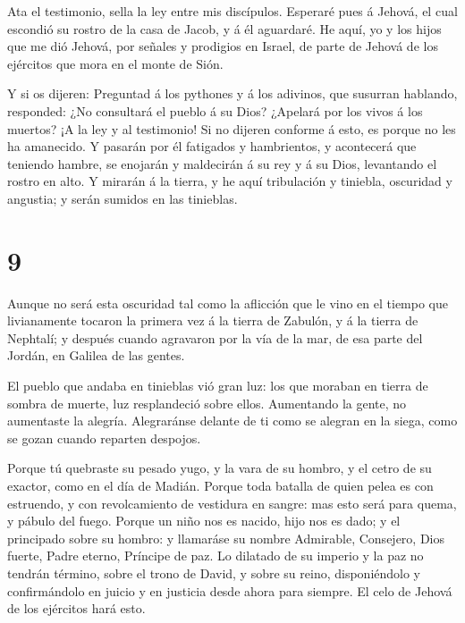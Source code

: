  Ata el testimonio, sella la ley entre mis discípulos.
 Esperaré pues á Jehová, el cual escondió su rostro de la
casa de Jacob, y á él aguardaré.  He aquí, yo y los hijos
que me dió Jehová, por señales y prodigios en Israel, de parte de Jehová
de los ejércitos que mora en el monte de Sión.

 Y si os dijeren: Preguntad á los pythones y á los
adivinos, que susurran hablando, responded: ¿No consultará el pueblo á
su Dios? ¿Apelará por los vivos á los muertos?  ¡A la ley y
al testimonio! Si no dijeren conforme á esto, es porque no les ha
amanecido.  Y pasarán por él fatigados y hambrientos, y
acontecerá que teniendo hambre, se enojarán y maldecirán á su rey y á su
Dios, levantando el rostro en alto.  Y mirarán á la tierra,
y he aquí tribulación y tiniebla, oscuridad y angustia; y serán sumidos
en las tinieblas.

\hypertarget{section-8}{%
\section{9}\label{section-8}}

 Aunque no será esta oscuridad tal como la aflicción que le
vino en el tiempo que livianamente tocaron la primera vez á la tierra de
Zabulón, y á la tierra de Nephtalí; y después cuando agravaron por la
vía de la mar, de esa parte del Jordán, en Galilea de las gentes.

 El pueblo que andaba en tinieblas vió gran luz: los que
moraban en tierra de sombra de muerte, luz resplandeció sobre ellos.
 Aumentando la gente, no aumentaste la alegría. Alegraránse
delante de ti como se alegran en la siega, como se gozan cuando reparten
despojos.

 Porque tú quebraste su pesado yugo, y la vara de su hombro,
y el cetro de su exactor, como en el día de Madián.  Porque
toda batalla de quien pelea es con estruendo, y con revolcamiento de
vestidura en sangre: mas esto será para quema, y pábulo del fuego.
 Porque un niño nos es nacido, hijo nos es dado; y el
principado sobre su hombro: y llamaráse su nombre Admirable, Consejero,
Dios fuerte, Padre eterno, Príncipe de paz.  Lo dilatado de
su imperio y la paz no tendrán término, sobre el trono de David, y sobre
su reino, disponiéndolo y confirmándolo en juicio y en justicia desde
ahora para siempre. El celo de Jehová de los ejércitos hará esto.

